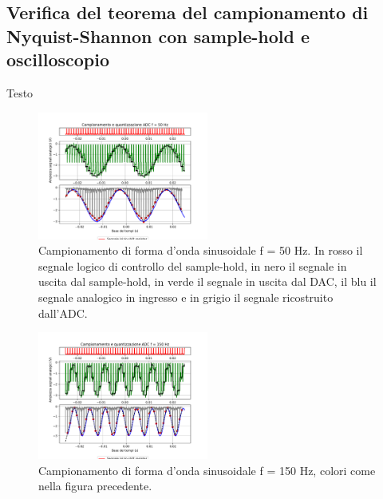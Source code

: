 \documentclass[journal]{IEEEtran}
\begin{document}
\subsection{Verifica del teorema del campionamento di Nyquist-Shannon con sample-hold e oscilloscopio}
Testo

\clearpage
\clearpage
\begin{figure}[H]%
\begin{center}
\includegraphics[trim={0 25 0 0}, clip, width=0.50\textwidth]{analysis/output/campionamento_50Hz.pdf}

\caption{Campionamento di forma d'onda sinusoidale f = 50 Hz. In rosso il segnale logico di controllo del sample-hold, in nero il segnale in uscita dal sample-hold, in verde il segnale in uscita dal DAC, il blu il segnale analogico in ingresso e in grigio il segnale ricostruito dall'ADC.}
\label{fig:sampSH1}
\end{center}
\end{figure}
\vspace{-10mm}
%
\begin{figure}[H]%
\begin{center}
\includegraphics[trim={0 25 0 0}, clip,width=0.50\textwidth]{analysis/output/campionamento_150Hz.pdf}
\caption{Campionamento di forma d'onda sinusoidale f = 150 Hz, colori come nella figura precedente.}
\label{fig:sampSH2}
\end{center}
\end{figure}
\vspace{-10mm}
%
\end{document}
